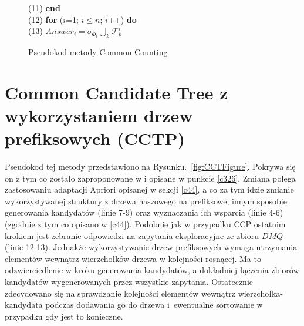 \begin{figure}[h]
	\hspace*{6em} (11)\hspace{1em} \textbf{end} \\
	\hspace*{6em} (12)\hspace{1em} \textbf{for} ($i$=1; $i \leq n$; $i$++) \textbf{do} \\
	\hspace*{6em} (13)\hspace{2em}    $Answer_i = \sigma_{\Phi_i} \bigcup_k \mathcal{F}_k^i$
	\caption{Pseudokod metody Common Counting}
	\label{fig:CCFigure}
\end{figure}


\section{Common Candidate Tree z wykorzystaniem drzew prefiksowych (CCTP)}
\label{c46}
Pseudokod tej metody przedstawiono na Rysunku.~\ref{fig:CCTFigure}. Pokrywa się on z tym co zostało zaproponowane w \cite{WojciechowskiCCT} i opisane w punkcie \ref{c326}. Zmiana polega zastosowaniu adaptacji Apriori opisanej w sekcji \ref{c44}, a co za tym idzie zmianie wykorzystywanej struktury z drzewa haszowego na prefiksowe, innym sposobie generowania kandydatów (linie 7-9) oraz wyznaczania ich wsparcia (linie 4-6) (zgodnie z tym co opisano w \ref{c44}). Podobnie jak w przypadku CCP ostatnim krokiem jest zebranie odpowiedzi na zapytania eksploracyjne ze zbioru \(DMQ\) (linie 12-13). Jednakże wykorzystywanie drzew prefiksowych wymaga utrzymania elementów wewnątrz wierzchołków drzewa w kolejności rosnącej. Ma to odzwierciedlenie w kroku generowania kandydatów, a dokładniej łączenia zbiorów kandydatów wygenerowanych przez wszystkie zapytania. Ostatecznie zdecydowano się na sprawdzanie kolejności elementów wewnątrz wierzchołka-kandydata podczas dodawania go do drzewa i~ewentualne sortowanie w przypadku gdy jest to konieczne. 
